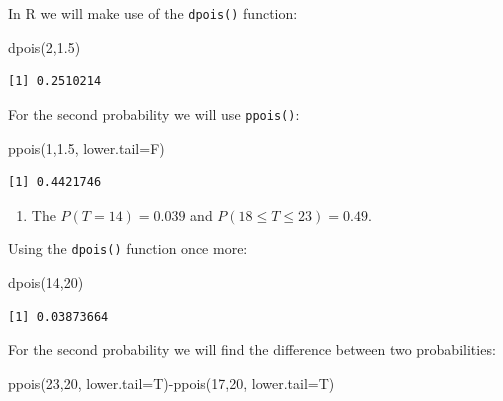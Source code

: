 \documentclass[
  letterpaper,
  DIV=11,
  numbers=noendperiod]{scrreprt}
\newenvironment{Shaded}{\begin{snugshade}}{\end{snugshade}}
\newcommand{\AttributeTok}[1]{\textcolor[rgb]{0.40,0.45,0.13}{#1}}
\newcommand{\DecValTok}[1]{\textcolor[rgb]{0.68,0.00,0.00}{#1}}
\newcommand{\FloatTok}[1]{\textcolor[rgb]{0.68,0.00,0.00}{#1}}
\newcommand{\FunctionTok}[1]{\textcolor[rgb]{0.28,0.35,0.67}{#1}}
\newcommand{\NormalTok}[1]{\textcolor[rgb]{0.00,0.23,0.31}{#1}}
\newcommand{\SpecialCharTok}[1]{\textcolor[rgb]{0.37,0.37,0.37}{#1}}
\providecommand{\tightlist}{%
  \setlength{\itemsep}{0pt}\setlength{\parskip}{0pt}}\usepackage{longtable,booktabs,array}
\begin{document}
In R we will make use of the \texttt{dpois()} function:

\begin{Shaded}
\begin{Highlighting}[numbers=left,,]
\FunctionTok{dpois}\NormalTok{(}\DecValTok{2}\NormalTok{,}\FloatTok{1.5}\NormalTok{)}
\end{Highlighting}
\end{Shaded}

\begin{verbatim}
[1] 0.2510214
\end{verbatim}

For the second probability we will use \texttt{ppois()}:

\begin{Shaded}
\begin{Highlighting}[numbers=left,,]
\FunctionTok{ppois}\NormalTok{(}\DecValTok{1}\NormalTok{,}\FloatTok{1.5}\NormalTok{, }\AttributeTok{lower.tail=}\NormalTok{F)}
\end{Highlighting}
\end{Shaded}

\begin{verbatim}
[1] 0.4421746
\end{verbatim}

\begin{enumerate}
\def\labelenumi{\arabic{enumi}.}
\setcounter{enumi}{1}
\tightlist
\item
  The \(P(T=14)=0.039\) and \(P(18 \leq T \leq 23)=0.49\).
\end{enumerate}

Using the \texttt{dpois()} function once more:

\begin{Shaded}
\begin{Highlighting}[numbers=left,,]
\FunctionTok{dpois}\NormalTok{(}\DecValTok{14}\NormalTok{,}\DecValTok{20}\NormalTok{)}
\end{Highlighting}
\end{Shaded}

\begin{verbatim}
[1] 0.03873664
\end{verbatim}

For the second probability we will find the difference between two
probabilities:

\begin{Shaded}
\begin{Highlighting}[numbers=left,,]
\FunctionTok{ppois}\NormalTok{(}\DecValTok{23}\NormalTok{,}\DecValTok{20}\NormalTok{, }\AttributeTok{lower.tail=}\NormalTok{T)}\SpecialCharTok{{-}}\FunctionTok{ppois}\NormalTok{(}\DecValTok{17}\NormalTok{,}\DecValTok{20}\NormalTok{, }\AttributeTok{lower.tail=}\NormalTok{T)}
\end{Highlighting}
\end{Shaded}
\end{document}
